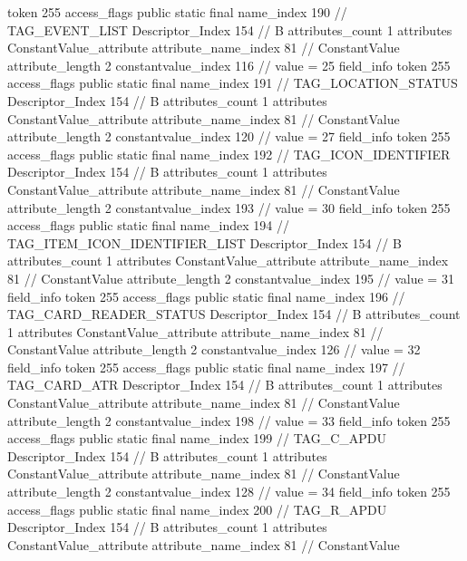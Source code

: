 {{{{{				token	255
				access_flags	public static final
				name_index	190		// TAG_EVENT_LIST
				Descriptor_Index	154		// B
				attributes_count	1
				attributes {
				ConstantValue_attribute {
					attribute_name_index	81		// ConstantValue
					attribute_length	2
					constantvalue_index	116		// value = 25
				}
				}
			}
			field_info {
				token	255
				access_flags	public static final
				name_index	191		// TAG_LOCATION_STATUS
				Descriptor_Index	154		// B
				attributes_count	1
				attributes {
				ConstantValue_attribute {
					attribute_name_index	81		// ConstantValue
					attribute_length	2
					constantvalue_index	120		// value = 27
				}
				}
			}
			field_info {
				token	255
				access_flags	public static final
				name_index	192		// TAG_ICON_IDENTIFIER
				Descriptor_Index	154		// B
				attributes_count	1
				attributes {
				ConstantValue_attribute {
					attribute_name_index	81		// ConstantValue
					attribute_length	2
					constantvalue_index	193		// value = 30
				}
				}
			}
			field_info {
				token	255
				access_flags	public static final
				name_index	194		// TAG_ITEM_ICON_IDENTIFIER_LIST
				Descriptor_Index	154		// B
				attributes_count	1
				attributes {
				ConstantValue_attribute {
					attribute_name_index	81		// ConstantValue
					attribute_length	2
					constantvalue_index	195		// value = 31
				}
				}
			}
			field_info {
				token	255
				access_flags	public static final
				name_index	196		// TAG_CARD_READER_STATUS
				Descriptor_Index	154		// B
				attributes_count	1
				attributes {
				ConstantValue_attribute {
					attribute_name_index	81		// ConstantValue
					attribute_length	2
					constantvalue_index	126		// value = 32
				}
				}
			}
			field_info {
				token	255
				access_flags	public static final
				name_index	197		// TAG_CARD_ATR
				Descriptor_Index	154		// B
				attributes_count	1
				attributes {
				ConstantValue_attribute {
					attribute_name_index	81		// ConstantValue
					attribute_length	2
					constantvalue_index	198		// value = 33
				}
				}
			}
			field_info {
				token	255
				access_flags	public static final
				name_index	199		// TAG_C_APDU
				Descriptor_Index	154		// B
				attributes_count	1
				attributes {
				ConstantValue_attribute {
					attribute_name_index	81		// ConstantValue
					attribute_length	2
					constantvalue_index	128		// value = 34
				}
				}
			}
			field_info {
				token	255
				access_flags	public static final
				name_index	200		// TAG_R_APDU
				Descriptor_Index	154		// B
				attributes_count	1
				attributes {
				ConstantValue_attribute {
					attribute_name_index	81		// ConstantValue
}}}}}}}

